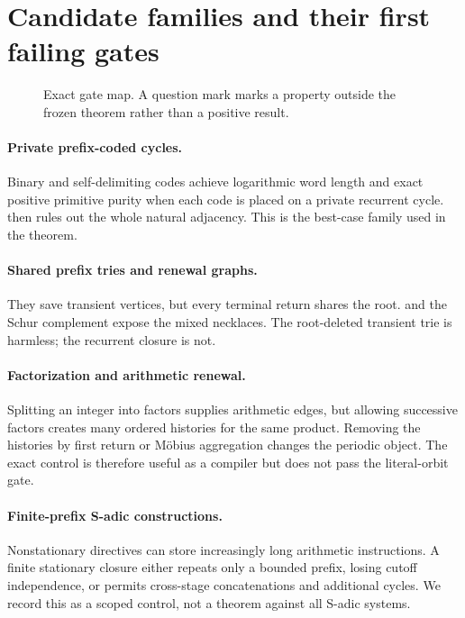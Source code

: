 \section{Candidate families and their first failing gates}

\begin{figure}[t]
\centering

\caption{Exact gate map.  A question mark marks a property outside the
frozen theorem rather than a positive result.}
\label{fig:gates}
\end{figure}

\paragraph{Private prefix-coded cycles.}
Binary and self-delimiting codes achieve logarithmic word length and exact
positive primitive purity when each code is placed on a private recurrent
cycle.   then rules out the whole natural adjacency.
This is the best-case family used in the theorem.

\paragraph{Shared prefix tries and renewal graphs.}
They save transient vertices, but every terminal return shares the root.
 and the Schur complement expose the mixed necklaces.
The root-deleted transient trie is harmless; the recurrent closure is not.

\paragraph{Factorization and arithmetic renewal.}
Splitting an integer into factors supplies arithmetic edges, but allowing
successive factors creates many ordered histories for the same product.
Removing the histories by first return or Möbius aggregation changes the
periodic object.  The exact control is therefore useful as a compiler but
does not pass the literal-orbit gate.

\paragraph{Finite-prefix S-adic constructions.}
Nonstationary directives can store increasingly long arithmetic
instructions.  A finite stationary closure either repeats only a bounded
prefix, losing cutoff independence, or permits cross-stage concatenations
and additional cycles.  We record this as a scoped control, not a theorem
against all S-adic systems.

